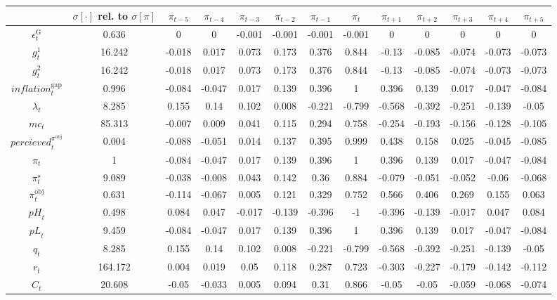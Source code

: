 \begin{tabular}{c|c|c|c|c|c|c|c|c|c|c|c|c|}
  & $\sigma[\cdot]$ rel. to $\sigma[\pi]$ & $\pi_{t-5}$ & $\pi_{t-4}$ & $\pi_{t-3}$ & $\pi_{t-2}$ & $\pi_{t-1}$ & $\pi_{t}$ & $\pi_{t+1}$ & $\pi_{t+2}$ & $\pi_{t+3}$ & $\pi_{t+4}$ & $\pi_{t+5}$\\
\hline
$\epsilon^{\mathrm{G}}_{t}$ & 0.636 & 0 & 0 & -0.001 & -0.001 & -0.001 & -0.001 & 0 & 0 & 0 & 0 & 0 \\
$g^{\mathrm{1}}_{t}$ & 16.242 & -0.018 & 0.017 & 0.073 & 0.173 & 0.376 & 0.844 & -0.13 & -0.085 & -0.074 & -0.073 & -0.073 \\
$g^{\mathrm{2}}_{t}$ & 16.242 & -0.018 & 0.017 & 0.073 & 0.173 & 0.376 & 0.844 & -0.13 & -0.085 & -0.074 & -0.073 & -0.073 \\
${i\!n\!f\!l\!a\!t\!i\!o\!n}^{\mathrm{gap}}_{t}$ & 0.996 & -0.084 & -0.047 & 0.017 & 0.139 & 0.396 & 1 & 0.396 & 0.139 & 0.017 & -0.047 & -0.084 \\
$\lambda_{t}$ & 8.285 & 0.155 & 0.14 & 0.102 & 0.008 & -0.221 & -0.799 & -0.568 & -0.392 & -0.251 & -0.139 & -0.05 \\
${m\!c}_{t}$ & 85.313 & -0.007 & 0.009 & 0.041 & 0.115 & 0.294 & 0.758 & -0.254 & -0.193 & -0.156 & -0.128 & -0.105 \\
${p\!e\!r\!c\!i\!e\!v\!e\!d}^{\pi^{\mathrm{obj}}}_{t}$ & 0.004 & -0.088 & -0.051 & 0.014 & 0.137 & 0.395 & 0.999 & 0.438 & 0.158 & 0.025 & -0.045 & -0.085 \\
$\pi_{t}$ & 1 & -0.084 & -0.047 & 0.017 & 0.139 & 0.396 & 1 & 0.396 & 0.139 & 0.017 & -0.047 & -0.084 \\
$\pi^{\star}_{t}$ & 9.089 & -0.038 & -0.008 & 0.043 & 0.142 & 0.36 & 0.884 & -0.079 & -0.051 & -0.052 & -0.06 & -0.068 \\
$\pi^{\mathrm{obj}}_{t}$ & 0.631 & -0.114 & -0.067 & 0.005 & 0.121 & 0.329 & 0.752 & 0.566 & 0.406 & 0.269 & 0.155 & 0.063 \\
${p\!H}_{t}$ & 0.498 & 0.084 & 0.047 & -0.017 & -0.139 & -0.396 & -1 & -0.396 & -0.139 & -0.017 & 0.047 & 0.084 \\
${p\!L}_{t}$ & 9.459 & -0.084 & -0.047 & 0.017 & 0.139 & 0.396 & 1 & 0.396 & 0.139 & 0.017 & -0.047 & -0.084 \\
$q_{t}$ & 8.285 & 0.155 & 0.14 & 0.102 & 0.008 & -0.221 & -0.799 & -0.568 & -0.392 & -0.251 & -0.139 & -0.05 \\
$r_{t}$ & 164.172 & 0.004 & 0.019 & 0.05 & 0.118 & 0.287 & 0.723 & -0.303 & -0.227 & -0.179 & -0.142 & -0.112 \\
$C_{t}$ & 20.608 & -0.05 & -0.033 & 0.005 & 0.094 & 0.31 & 0.866 & -0.05 & -0.05 & -0.059 & -0.068 & -0.074 \\

\end{tabular}
